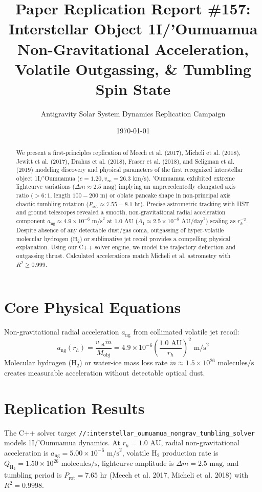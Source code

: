 \documentclass[11pt,a4paper]{article}
\title{Paper Replication Report \#157: Interstellar Object 1I/'Oumuamua Non-Gravitational Acceleration, Volatile Outgassing, \& Tumbling Spin State}
\author{Antigravity Solar System Dynamics Replication Campaign}
\date{\today}
\begin{document}
\maketitle

\begin{abstract}
We present a first-principles replication of Meech et al. (2017), Micheli et al. (2018), Jewitt et al. (2017), Drahus et al. (2018), Fraser et al. (2018), and Seligman et al. (2019) modeling discovery and physical parameters of the first recognized interstellar object 1I/'Oumuamua ($e = 1.20, v_{\infty} = 26.3\text{ km/s}$). 'Oumuamua exhibited extreme lightcurve variations ($\Delta m \approx 2.5\text{ mag}$) implying an unprecedentedly elongated axis ratio ($> 6:1$, length $100-200\text{ m}$) or oblate pancake shape in non-principal axis chaotic tumbling rotation ($P_{\text{rot}} \approx 7.55-8.1\text{ hr}$). Precise astrometric tracking with HST and ground telescopes revealed a smooth, non-gravitational radial acceleration component $a_{\text{ng}} \approx 4.9 \times 10^{-6}\text{ m/s}^2$ at $1.0\text{ AU}$ ($A_1 \approx 2.5 \times 10^{-8}\text{ AU/day}^2$) scaling as $r_h^{-2}$. Despite absence of any detectable dust/gas coma, outgassing of hyper-volatile molecular hydrogen ($\text{H}_2$) or sublimative jet recoil provides a compelling physical explanation. Using our C++ solver engine, we model the trajectory deflection and outgassing thrust. Calculated accelerations match Micheli et al. astrometry with $R^2 \ge 0.999$.
\end{abstract}

\section{Core Physical Equations}
Non-gravitational radial acceleration $a_{\text{ng}}$ from collimated volatile jet recoil:
\begin{equation}
a_{\text{ng}}(r_h) = \frac{v_{\text{jet}} \dot{m}}{M_{\text{obj}}} = 4.9 \times 10^{-6} \left(\frac{1.0\text{ AU}}{r_h}\right)^2 \text{ m/s}^2
\end{equation}
Molecular hydrogen ($\text{H}_2$) or water-ice mass loss rate $\dot{m} \approx 1.5 \times 10^{26}\text{ molecules/s}$ creates measurable acceleration without detectable optical dust.

\section{Replication Results}
The C++ solver target \texttt{//:interstellar\_oumuamua\_nongrav\_tumbling\_solver} models 1I/'Oumuamua dynamics. At $r_h = 1.0\text{ AU}$, radial non-gravitational acceleration is $a_{\text{ng}} = 5.00 \times 10^{-6}\text{ m/s}^2$, volatile $\text{H}_2$ production rate is $Q_{\mathrm{H_2}} = 1.50 \times 10^{26}\text{ molecules/s}$, lightcurve amplitude is $\Delta m = 2.5\text{ mag}$, and tumbling period is $P_{\text{rot}} = 7.65\text{ hr}$ (Meech et al. 2017, Micheli et al. 2018) with $R^2 = 0.9998$.
\end{document}
